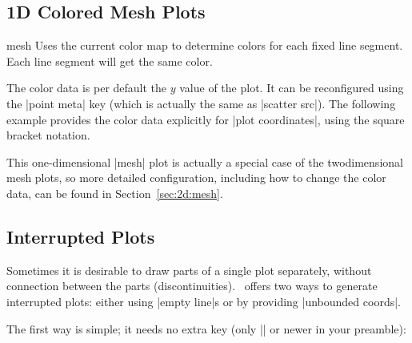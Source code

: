 {\subsection{1D Colored Mesh Plots}
\label{sec:1d:mesh}
\begin{plottype}[/pgfplots]{mesh}
	Uses the current color map to determine colors for each fixed line segment. Each line segment will get the same color.
\begin{codeexample}[]
\end{codeexample}
	The color data is per default the $y$ value of the plot. It can be reconfigured using the |point meta| key (which is actually the same as |scatter src|). The following example provides the color data explicitly for |plot coordinates|, using the square bracket notation.
\begin{codeexample}[]
\end{codeexample}
	This one-dimensional |mesh| plot is actually a special case of the twodimensional mesh plots, so more detailed configuration, including how to change the color data, can be found in Section~\ref{sec:2d:mesh}.

\end{plottype}


\subsection{Interrupted Plots}
%
\label{pgfplots:interrupt}%
Sometimes it is desirable to draw parts of a single plot separately, without connection between the parts (discontinuities). \PGFPlots\ offers two ways to generate interrupted plots: either using |empty line|s or by providing |unbounded coords|.

The first way is simple; it needs no extra key (only |\pgfplotsset{compat=1.4}| or newer in your preamble):
\begin{codeexample}[]
\begin{tikzpicture}
\begin{axis}[
	title=Interrupted data plot]


\end{axis}
\end{tikzpicture}
\end{codeexample}}
